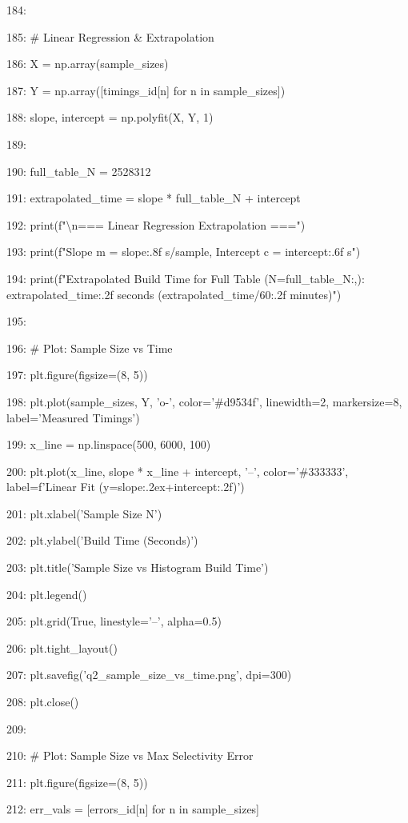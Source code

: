 \documentclass[11pt,a4paper]{article}
\begin{document}
{184:

185:     \# Linear Regression \& Extrapolation

186:     X = np.array(sample\_sizes)

187:     Y = np.array([timings\_id[n] for n in sample\_sizes])

188:     slope, intercept = np.polyfit(X, Y, 1)

189:

190:     full\_table\_N = 2528312

191:     extrapolated\_time = slope * full\_table\_N + intercept

192:     print(f"\textbackslash{}n=== Linear Regression Extrapolation ===")

193:     print(f"Slope m = {slope:.8f} s/sample, Intercept c = {intercept:.6f} s")

194:     print(f"Extrapolated Build Time for Full Table (N={full\_table\_N:,}): {extrapolated\_time:.2f} seconds ({extrapolated\_time/60:.2f} minutes)")

195:

196:     \# Plot: Sample Size vs Time

197:     plt.figure(figsize=(8, 5))

198:     plt.plot(sample\_sizes, Y, 'o-', color='\#d9534f', linewidth=2, markersize=8, label='Measured Timings')

199:     x\_line = np.linspace(500, 6000, 100)

200:     plt.plot(x\_line, slope * x\_line + intercept, '--', color='\#333333', label=f'Linear Fit (y={slope:.2e}x+{intercept:.2f})')

201:     plt.xlabel('Sample Size N')

202:     plt.ylabel('Build Time (Seconds)')

203:     plt.title('Sample Size vs Histogram Build Time')

204:     plt.legend()

205:     plt.grid(True, linestyle='--', alpha=0.5)

206:     plt.tight\_layout()

207:     plt.savefig('q2\_sample\_size\_vs\_time.png', dpi=300)

208:     plt.close()

209:

210:     \# Plot: Sample Size vs Max Selectivity Error

211:     plt.figure(figsize=(8, 5))

212:     err\_vals = [errors\_id[n] for n in sample\_sizes]

}
\end{document}
